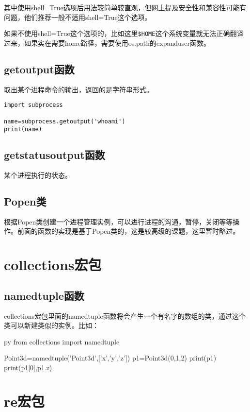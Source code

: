 \documentclass[12pt,oneside]{book}
\begin{document}
\begin{common-format}
其中使用shell=True选项后用法较简单较直观，但网上提及安全性和兼容性可能有问题，他们推荐一般不适用shell=True这个选项。

如果不使用shell=True这个选项的，比如这里\verb+$HOME+这个系统变量就无法正确翻译过来，如果实在需要home路径，需要使用os.path的expanduser函数。



\section{getoutput函数}
取出某个进程命令的输出，返回的是字符串形式。
\begin{Verbatim}
import subprocess

name=subprocess.getoutput('whoami')
print(name)
\end{Verbatim}



\section{getstatusoutput函数}
某个进程执行的状态。



\section{Popen类}
根据Popen类创建一个进程管理实例，可以进行进程的沟通，暂停，关闭等等操作。前面的函数的实现是基于Popen类的，这是较高级的课题，这里暂时略过。




\chapter{collections宏包}
\section{namedtuple函数}
collections宏包里面的namedtuple函数将会产生一个有名字的数组的类，通过这个类可以新建类似的实例。比如：
\begin{xverbatim}[129]{py}
from collections import namedtuple

Point3d=namedtuple('Point3d',['x','y','z'])
p1=Point3d(0,1,2)
print(p1)
print(p1[0],p1.z)
\end{xverbatim}


\chapter{re宏包}
\label{sec:re宏包}



\end{common-format}
\end{document}
